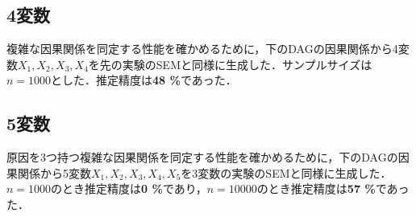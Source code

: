 \documentclass[dvipdfmx]{jsarticle}
\begin{document}
\subsection{4変数}
複雑な因果関係を同定する性能を確かめるために，下のDAGの因果関係から4変数$X_1, X_2, X_3, X_4$を先の実験のSEMと同様に生成した．サンプルサイズは$n=1000$とした．推定精度は\textbf{48 \%}であった．


\subsection{5変数}
原因を3つ持つ複雑な因果関係を同定する性能を確かめるために，下のDAGの因果関係から5変数$X_1, X_2, X_3, X_4, X_5$を3変数の実験のSEMと同様に生成した．$n=1000$のとき推定精度は\textbf{0 \%}であり，$n=10000$のとき推定精度は\textbf{57 \%}であった．





\end{document}

